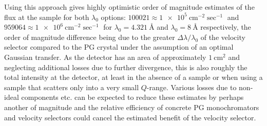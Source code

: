 Using this approach gives highly optimistic order of magnitude estimates of the flux at the sample for both $\lambda_0$ options: $100021 \approx \SI{1e5}{\centi\meter^{-2}\sec^{-1}}$ and $959064 \approx \SI{1e6}{\centi\meter^{-2}\sec^{-1}}$ for $\lambda_0 = \SI{4.321}{\angstrom}$ and $\lambda_0 = \SI{8}{\angstrom}$ respectively, the order of magnitude difference being due to the greater $\Delta\lambda/\lambda_0$ of the velocity selector compared to the PG crystal under the assumption of an optimal Gaussian transfer. As the detector has an area of approximately $\SI{1}{\centi\meter^2}$ and neglecting additional losses due to further divergence, this is also roughly the total intensity at the detector, at least in the absence of a sample or when using a sample that scatters only into a very small $Q$-range. Various losses due to non-ideal components etc. can be expected to reduce these estimates by perhaps another of magnitude and the relative efficiency of concrete PG monochromators and velocity selectors could cancel the estimated benefit of the velocity selector.

